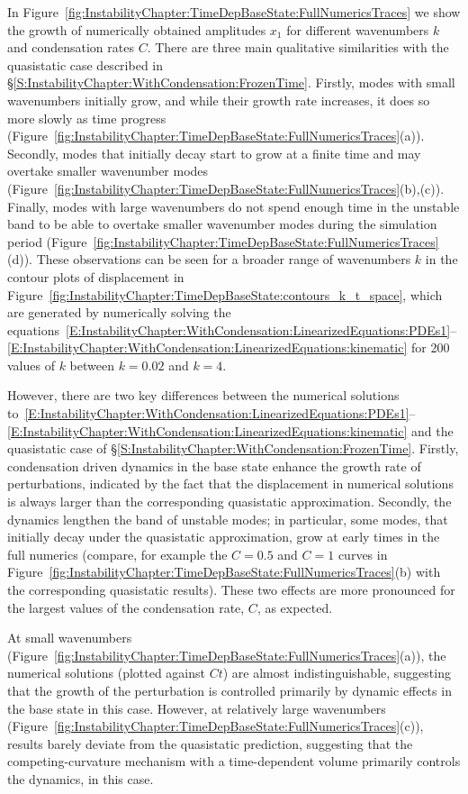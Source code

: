In Figure~\ref{fig:InstabilityChapter:TimeDepBaseState:FullNumericsTraces} we show the growth of numerically obtained amplitudes $x_1$ for different wavenumbers $k$ and condensation rates $C$.  There are three main qualitative similarities with the quasistatic case described in \S\ref{S:InstabilityChapter:WithCondensation:FrozenTime}. Firstly, modes with small wavenumbers initially grow, and while their growth rate increases, it does so more slowly as time progress (Figure~\ref{fig:InstabilityChapter:TimeDepBaseState:FullNumericsTraces}(a)). Secondly, modes that initially decay start to grow at a finite time and may overtake smaller wavenumber modes (Figure~\ref{fig:InstabilityChapter:TimeDepBaseState:FullNumericsTraces}(b),(c)). Finally, modes with large wavenumbers do not spend enough time in the unstable band to be able to overtake smaller wavenumber modes during the simulation period (Figure~\ref{fig:InstabilityChapter:TimeDepBaseState:FullNumericsTraces}(d)). These observations can be seen for a broader range of wavenumbers $k$ in the contour plots of displacement in Figure~\ref{fig:InstabilityChapter:TimeDepBaseState:contours_k_t_space}, which are generated by numerically solving the equations~\eqref{E:InstabilityChapter:WithCondensation:LinearizedEquations:PDEs1}--\eqref{E:InstabilityChapter:WithCondensation:LinearizedEquations:kinematic} for 200 values of $k$ between $k = 0.02$ and $k = 4$.

However, there are two key differences between the numerical solutions to~\eqref{E:InstabilityChapter:WithCondensation:LinearizedEquations:PDEs1}--\eqref{E:InstabilityChapter:WithCondensation:LinearizedEquations:kinematic} and the quasistatic case of \S\ref{S:InstabilityChapter:WithCondensation:FrozenTime}. Firstly, condensation driven dynamics in the base state enhance the growth rate of perturbations, indicated by the fact that the displacement in numerical solutions is always larger than the corresponding quasistatic approximation. Secondly, the dynamics lengthen the band of unstable modes; in particular, some modes, that initially decay under the quasistatic approximation, grow at early times in the full numerics (compare, for example the $C =0.5$ and $C = 1$ curves in Figure~\ref{fig:InstabilityChapter:TimeDepBaseState:FullNumericsTraces}(b) with the corresponding quasistatic results). These two effects are more pronounced for the largest values of the condensation rate, $C$, as expected.

 At small wavenumbers (Figure~\ref{fig:InstabilityChapter:TimeDepBaseState:FullNumericsTraces}(a)), the numerical solutions (plotted against $Ct$) are almost indistinguishable, suggesting that the growth of the perturbation is controlled primarily by dynamic effects in the base state in this case.
However, at relatively large wavenumbers (Figure~\ref{fig:InstabilityChapter:TimeDepBaseState:FullNumericsTraces}(c)), results barely deviate from the quasistatic prediction, suggesting that the competing-curvature mechanism with a time-dependent volume primarily controls the dynamics, in this case.


